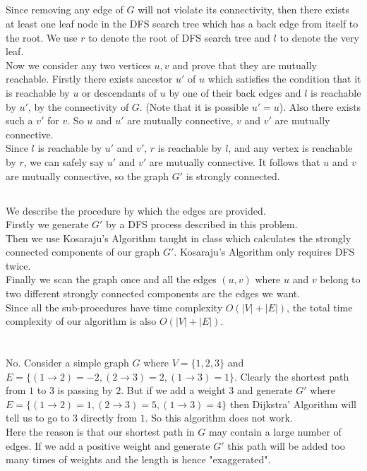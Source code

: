 \documentclass[12pt,letterpaper]{article}
\begin{document}
\subsection{}
Since removing any edge of $G$ will not violate its connectivity, then there exists at least one leaf node in the DFS search tree which has a back edge from itself to the root. We use $r$ to denote the root of DFS search tree and $l$ to denote the very leaf.\\
Now we consider any two vertices $u,v$ and prove that they are mutually reachable. Firstly there exists ancestor $u'$ of $u$ which satisfies the condition that it is reachable by $u$ or descendants of $u$ by one of their back edges and $l$ is reachable by $u'$, by the connectivity of $G$. (Note that it is possible $u'=u$). Also there exists such a $v'$ for $v$. So $u$ and $u'$ are mutually connective, $v$ and $v'$ are mutually connective.\\
Since $l$ is reachable by $u'$ and $v'$, $r$ is reachable by $l$, and any vertex is reachable by $r$, we can safely say $u'$ and $v'$ are mutually connective. It follows that $u$ and $v$ are mutually connective, so the graph $G'$ is strongly connected.
\subsection{}
We describe the procedure by which the edges are provided.\\
Firstly we generate $G'$ by a DFS process described in this problem.\\
Then we use Kosaraju's Algorithm taught in class which calculates the strongly connected components of our graph $G'$. Kosaraju's Algorithm only requires DFS twice.\\
Finally we scan the graph once and all the edges $(u,v)$ where $u$ and $v$ belong to two different strongly connected components are the edges we want.\\
Since all the sub-procedures have time complexity $O(|V|+|E|)$, the total time complexity of our algorithm is also $O(|V|+|E|)$.
\section{}
\subsection{}
No. Consider a simple graph $G$ where $V=\{1,2,3\}$ and $E=\{(1\to2)=-2,(2\to3)=2,(1\to3)=1\}$. Clearly the shortest path from $1$ to $3$ is passing by $2$. But if we add a weight $3$ and generate $G'$ where $E=\{(1\to2)=1,(2\to3)=5,(1\to3)=4\}$ then Dijkstra' Algorithm will tell us to go to $3$ directly from $1$. So this algorithm does not work.\\
Here the reason is that our shortest path in $G$ may contain a large number of edges. If we add a positive weight and generate $G'$ this path will be added too many times of weights and the length is hence "exaggerated".
\end{document}
